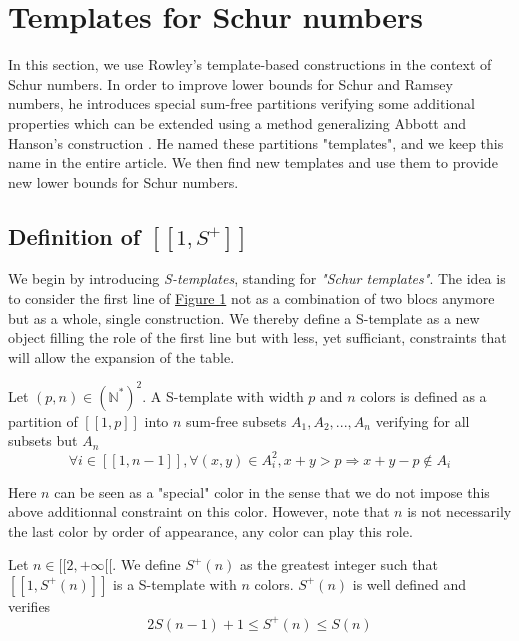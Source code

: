 \section{Templates for Schur numbers}
\label{Schur}

\qquad In this section, we use Rowley's template-based constructions \cite{RowleyRamsey} in the context of Schur 
numbers. In order to improve lower bounds for Schur and Ramsey numbers, he introduces special sum-free 
partitions verifying some additional properties which can be extended using a method generalizing Abbott and 
Hanson's construction \cite{AbbottHanson}. He named these partitions "templates", and we keep this name in 
the entire article. We then find new templates and use them to provide new lower bounds for Schur numbers.

\subsection{Definition of \( [\![ 1, S^+ ]\!] \)}

We begin by introducing \textit{S-templates}, standing for \textit{"Schur templates"}. The idea is to consider the first line
of \hyperref[figure:1]{Figure 1} not as a combination of two blocs anymore but as a whole, single construction. We thereby define a S-template as
a new object filling the role of the first line but with less, yet sufficiant, constraints that will allow the expansion of the
table.

\begin{definition}
Let \((p,n) \in (\mathbb{N}^*)^2\). A S-template with width \(p\) and \(n\) colors is defined as a partition of 
\([\![1,p]\!]\) into \(n\) sum-free subsets \(A_1, A_2, ..., A_n\) verifying for all subsets but \(A_n\)
\[
\forall i \in [\![1, n-1]\!], \forall (x,y) \in A_i^2, x+y > p
\Longrightarrow x+y-p \notin A_i
\]
\end{definition}

Here \(n\) can be seen as a "special" color in the sense that we do not impose this above additionnal constraint on this color. 
However, note that \(n\) is not necessarily the last color by order of appearance, any color can play this role.


\begin{proposition}
	Let \(n \in [\![2, +\infty[\![\). We define \(S^+(n)\) as the greatest integer such that \( [\![1, S^+(n)]\!]\) is a S-template with \(n\) colors. 
	\(S^+(n)\) is well defined and verifies
	\[
	2S(n-1)+1 \leqslant S^+(n) \leqslant S(n)
	\]
\end{proposition}

